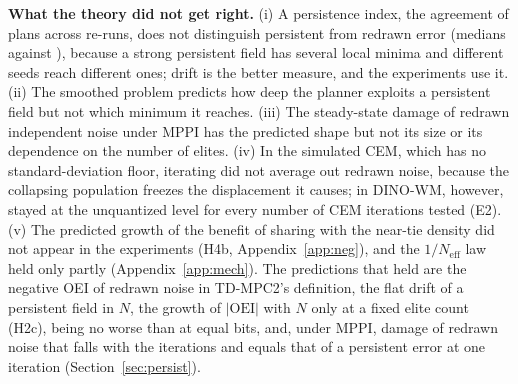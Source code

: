 \textbf{What the theory did not get right.} (i) A persistence index, the agreement of plans across re-runs, does not distinguish persistent from redrawn error (medians  against ), because a strong persistent field has several local minima and different seeds reach different ones; drift is the better measure, and the experiments use it. (ii) The smoothed problem predicts how deep the planner exploits a persistent field but not which minimum it reaches. (iii) The steady-state damage of redrawn independent noise under MPPI has the predicted shape but not its size or its dependence on the number of elites. (iv) In the simulated CEM, which has no standard-deviation floor, iterating did not average out redrawn noise, because the collapsing population freezes the displacement it causes; in DINO-WM, however, \shiter stayed at the unquantized level for every number of CEM iterations tested (E2). (v) The predicted growth of the benefit of sharing with the near-tie density did not appear in the experiments (H4b, Appendix~\ref{app:neg}), and the $1/N_{\mathrm{eff}}$ law held only partly (Appendix~\ref{app:mech}). The predictions that held are the negative OEI of redrawn noise in TD-MPC2's definition, the flat drift of a persistent field in $N$, the growth of $|\mathrm{OEI}|$ with $N$ only at a fixed elite count (H2c), \detshift being no worse than \shiter at equal bits, and, under MPPI, damage of redrawn noise that falls with the iterations and equals that of a persistent error at one iteration (Section~\ref{sec:persist}).
